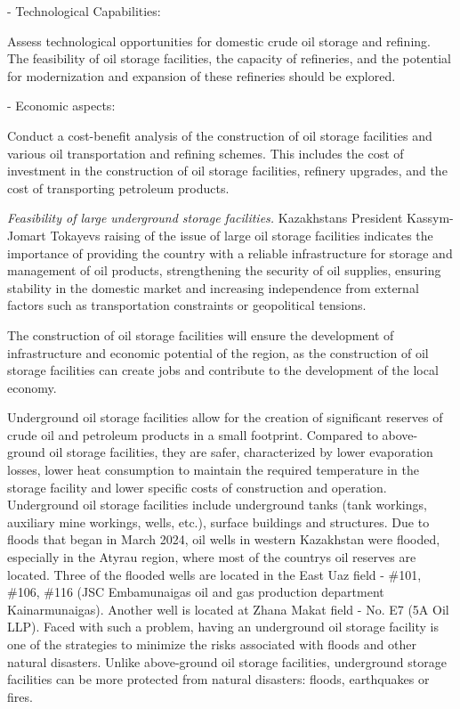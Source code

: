 - Technological Capabilities:

Assess technological opportunities for domestic crude oil storage and
refining. The feasibility of oil storage facilities, the capacity of
refineries, and the potential for modernization and expansion of these
refineries should be explored.

- Economic aspects:

Conduct a cost-benefit analysis of the construction of oil storage
facilities and various oil transportation and refining schemes. This
includes the cost of investment in the construction of oil storage
facilities, refinery upgrades, and the cost of transporting petroleum
products.

\emph{Feasibility of large underground storage facilities.}
Kazakhstan\textquotesingle s President Kassym-Jomart
Tokayev\textquotesingle s raising of the issue of large oil storage
facilities indicates the importance of providing the country with a
reliable infrastructure for storage and management of oil products,
strengthening the security of oil supplies, ensuring stability in the
domestic market and increasing independence from external factors such
as transportation constraints or geopolitical tensions.

The construction of oil storage facilities will ensure the development
of infrastructure and economic potential of the region, as the
construction of oil storage facilities can create jobs and contribute to
the development of the local economy.

Underground oil storage facilities allow for the creation of significant
reserves of crude oil and petroleum products in a small footprint.
Compared to above-ground oil storage facilities, they are safer,
characterized by lower evaporation losses, lower heat consumption to
maintain the required temperature in the storage facility and lower
specific costs of construction and operation. Underground oil storage
facilities include underground tanks (tank workings, auxiliary mine
workings, wells, etc.), surface buildings and structures. Due to floods
that began in March 2024, oil wells in western Kazakhstan were flooded,
especially in the Atyrau region, where most of the
country\textquotesingle s oil reserves are located. Three of the flooded
wells are located in the East Uaz field - \#101, \#106, \#116 (JSC
Embamunaigas oil and gas production department Kainarmunaigas). Another
well is located at Zhana Makat field - No. E7 (5A Oil LLP). Faced with
such a problem, having an underground oil storage facility is one of the
strategies to minimize the risks associated with floods and other
natural disasters. Unlike above-ground oil storage facilities,
underground storage facilities can be more protected from natural
disasters: floods, earthquakes or fires.

